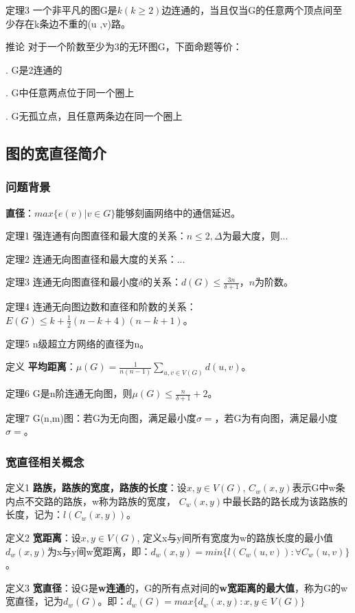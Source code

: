 \documentclass{article}
\begin{document}
定理3 一个非平凡的图G是$k (k\ge2)$边连通的，当且仅当G的任意两个顶点间至少存在k条边不重的(u ,v)路。

推论 对于一个阶数至少为3的无环图G，下面命题等价：

. G是2连通的

. G中任意两点位于同一个圈上

.  G无孤立点，且任意两条边在同一个圈上


\subsection{图的宽直径简介}

\subsubsection{问题背景}

\textbf{直径}：$max\{e(v) | v \in G\}$能够刻画网络中的通信延迟。

定理1 强连通有向图直径和最大度的关系：$n \le 2, \Delta$为最大度，则...


定理2 连通无向图直径和最大度的关系：...

定理3 连通无向图直径和最小度$\delta $的关系：$d(G) \le \frac{3n}{\delta + 1}$，$n$为阶数。

定理4 连通无向图边数和直径和阶数的关系：$E(G) \le k + \frac{1}{2}(n-k+4)(n-k+1)$。

定理5 n级超立方网络的直径为n。

定义 \textbf{平均距离}：$\mu(G) = \frac{1}{n(n-1)}\sum_{u,v\in V(G)}d(u,v)$。

定理6 G是n阶连通无向图，则$\mu(G) \le \frac{n}{\delta+1}+2$。

定理7 G(n,m)图：若G为无向图，满足最小度$\sigma = $，若G为有向图，满足最小度$\sigma = $。

\subsubsection{宽直径相关概念}

定义1 \textbf{路族，路族的宽度，路族的长度}：设$x, y \in V(G)$, $C_w (x, y)$表示G中w条内点不交路的路族，w称为路族的宽度， $C_w (x, y)$中最长路的路长成为该路族的长度，记为：$l (C_w (x, y))$。

定义2 \textbf{宽距离}：设$x, y \in V(G)$, 定义x与y间所有宽度为w的路族长度的最小值$d_w(x,y)$为x与y间w宽距离，即：$d
_w(x,y) = min\{l(C_w(u,v)):\forall C_w(u,v)\}$。

定义3 \textbf{宽直径}：设G是\textbf{w连通}的，G的所有点对间的\textbf{w宽距离的最大值}，称为G的w宽直径，记为$d_w (G)$。即：$d_w(G) = max\{d_w(x,y):x,y \in V(G)\}$
\end{document}
